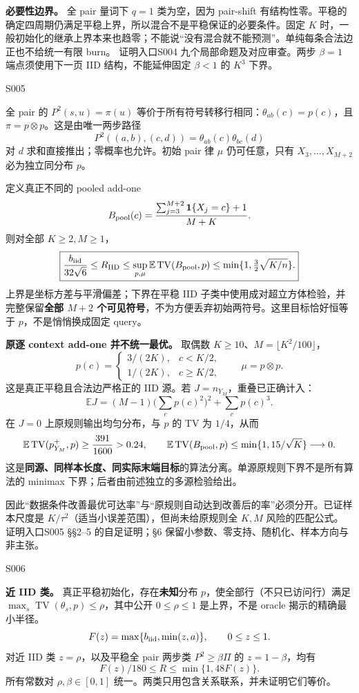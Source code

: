 \documentclass[11pt,a4paper]{article}
\renewcommand{\emph}[1]{\textbf{#1}}
\newcommand{\TV}{\operatorname{TV}}
\newcommand{\E}{\mathbb E}
\newcommand{\head}[2]{\begin{center}{\large\sffamily\color{ink}#1}\end{center}\vspace{-4pt}{\LARGE\bfseries #2}\par\vspace{5pt}}
\newcommand{\entry}[1]{\vfill\noindent\small\textcolor{ink}{证明入口}\quad#1\normalsize}
\begin{document}
\textbf{必要性边界。} 全 pair 量词下 $q=1$ 类为空，因为 pair-shift 有结构性零。平稳的确定四周期仍满足平稳上界，所以混合不是平稳保证的必要条件。固定 $K$ 时，一般初始化的继承上界本来也趋零；不能说“没有混合就不能预测”。单纯每条合法边正也不给统一有限 burn。
\entry{S004 九个局部命题及对应审查。两步 $\beta=1$ 端点须使用下一页 IID 结构，不能延伸固定 $\beta<1$ 的 $K^3$ 下界。}
\newpage
\head{S005}{两步完全 reset 的 IID 率与原算法反例}
全 pair 的 $P^2(s,u)=\pi(u)$ 等价于所有符号转移行相同：$\theta_{ab}(c)=p(c)$，且 $\pi=p\otimes p$。这是由唯一两步路径
\[
 P^2((a,b),(c,d))=\theta_{ab}(c)\theta_{bc}(d)
\]
对 $d$ 求和直接推出；零概率也允许。初始 pair 律 $\mu$ 仍可任意，只有 $X_3,\ldots,X_{M+2}$ 必为独立同分布 $p$。

定义真正不同的 pooled add-one
\[
 B_{\rm pool}(c)=\frac{\sum_{j=3}^{M+2}\mathbf1\{X_j=c\}+1}{M+K}.
\]
则对全部 $K\ge2,M\ge1$，
\[
 \boxed{\frac{b_{\rm iid}}{32\sqrt6}\le R_{\rm IID}
 \le\sup_{p,\mu}\E\TV(B_{\rm pool},p)
 \le\min\{1,\tfrac32\sqrt{K/n}\}.}
\]
上界是坐标方差与平滑偏差；下界在平稳 IID 子类中使用成对超立方体检验，并完整保留\textbf{全部 $M+2$ 个可见符号}，不为方便丢弃初始两符号。这里目标恰好恒等于 $p$，不是悄悄换成固定 query。

\textbf{原逐 context add-one 并不统一最优。} 取偶数 $K\ge10$、$M=\lfloor K^2/100\rfloor$，
\[
 p(c)=\begin{cases}3/(2K),&c<K/2,\\1/(2K),&c\ge K/2,\end{cases}
 \qquad\mu=p\otimes p.
\]
这是真正平稳且合法边严格正的 IID 源。若 $J=n_{Y_M}$，重叠已正确计入：
\[
 \E J=(M-1)\Big(\sum_c p(c)^2\Big)^2+\sum_c p(c)^3.
\]
在 $J=0$ 上原规则输出均匀分布，与 $p$ 的 TV 为 $1/4$，从而
\[
 \E\TV(p^+_{Y_M},p)\ge\frac{391}{1600}>0.24,
 \qquad
 \E\TV(B_{\rm pool},p)\le\min\{1,15/\sqrt K\}\longrightarrow0.
\]
这是\textbf{同源、同样本长度、同实际末端目标}的算法分离。单源原规则下界不是所有算法的 minimax 下界；后者由前述独立的多源检验给出。

因此“数据条件改善最优可达率”与“原规则自动达到改善后的率”必须分开。已证样本尺度是 $K/\tau^2$（适当小误差范围），但尚未给原规则全 $K,M$ 风险的匹配公式。
\entry{S005 §§2--5 的自足证明；§6 保留小参数、零支持、随机化、样本方向与非主张。}
\newpage
\head{S006}{平稳近 IID 与两步 minorization 的统一过渡}
\textbf{近 IID 类。} 真正平稳初始化，存在\emph{未知}分布 $p$，使全部行（不只已访问行）满足 $\max_s\TV(\theta_s,p)\le\rho$，其中公开 $0\le\rho\le1$ 是上界，不是 oracle 揭示的精确最小半径。
\[
 F(z)=\max\{b_{\rm iid},\min(z,a)\},\qquad 0\le z\le1.
\]
对近 IID 类 $z=\rho$，以及平稳全 pair 两步类 $P^2\ge\beta\Pi$ 的 $z=1-\beta$，均有
\[
 \boxed{\qquad F(z)/180\le R\le\min\{1,48F(z)\}.\qquad}
\]
所有常数对 $\rho,\beta\in[0,1]$ 统一。两类只用包含关系联系，并未证明它们等价。
\end{document}
